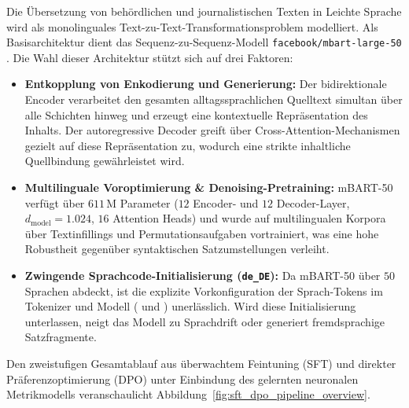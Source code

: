 Die Übersetzung von behördlichen und journalistischen Texten in Leichte Sprache wird als monolinguales Text-zu-Text-Transformationsproblem modelliert. Als Basisarchitektur dient das Sequenz-zu-Sequenz-Modell \texttt{facebook/mbart-large-50} \citep{tang2020multilingual, liu2020multilingual}. Die Wahl dieser Architektur stützt sich auf drei Faktoren:
\begin{itemize}
    \item \textbf{Entkopplung von Enkodierung und Generierung:} Der bidirektionale Encoder verarbeitet den gesamten alltagssprachlichen Quelltext simultan über alle Schichten hinweg und erzeugt eine kontextuelle Repräsentation des Inhalts. Der autoregressive Decoder greift über Cross-Attention-Mechanismen gezielt auf diese Repräsentation zu, wodurch eine strikte inhaltliche Quellbindung gewährleistet wird.
    \item \textbf{Multilinguale Voroptimierung \& Denoising-Pretraining:} mBART-50 verfügt über $611\,\text{M}$ Parameter ($12$ Encoder- und $12$ Decoder-Layer, $d_{\text{model}} = 1.024$, $16$ Attention Heads) und wurde auf multilingualen Korpora über Textinfillings und Permutationsaufgaben vortrainiert, was eine hohe Robustheit gegenüber syntaktischen Satzumstellungen verleiht.
    \item \textbf{Zwingende Sprachcode-Initialisierung (\texttt{de\_DE}):} Da mBART-50 über $50$ Sprachen abdeckt, ist die explizite Vorkonfiguration der Sprach-Tokens im Tokenizer und Modell ( und ) unerlässlich. Wird diese Initialisierung unterlassen, neigt das Modell zu Sprachdrift oder generiert fremdsprachige Satzfragmente.
\end{itemize}

Den zweistufigen Gesamtablauf aus überwachtem Feintuning (SFT) und direkter Präferenzoptimierung (DPO) unter Einbindung des gelernten neuronalen Metrikmodells veranschaulicht Abbildung~\ref{fig:sft_dpo_pipeline_overview}.

